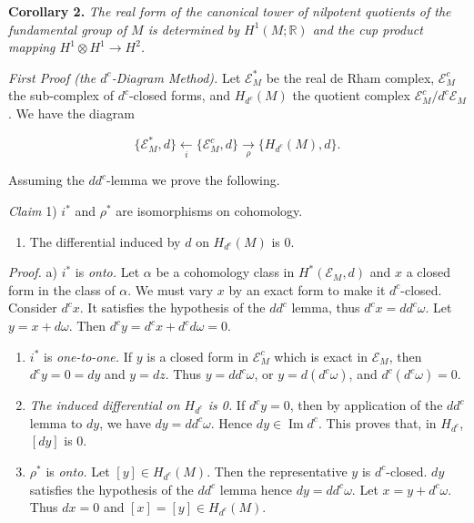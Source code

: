 \documentclass[
  english,
  a3paper,
  a3paper]{extarticle}
\providecommand{\tightlist}{%
  \setlength{\itemsep}{0pt}\setlength{\parskip}{0pt}}
\begin{document}
\textbf{Corollary 2.} \emph{The real form of the canonical tower of
nilpotent quotients of the fundamental group of \(M\) is determined by
\(H^1(M;\mathbb R)\) and the cup product mapping
\(H^1\otimes H^1\longrightarrow H^2\).}

\emph{First Proof (the \(d^c\)-Diagram Method).} Let \(\mathscr E_M^*\)
be the real de Rham complex, \(\mathscr E_M^c\) the sub-complex of
\(d^c\)-closed forms, and \(H_{d^c}(M)\) the quotient complex
\(\mathscr E_M^c/d^c\mathscr E_M\). We have the diagram

\[\{\mathscr E_M^*,d\}\underset{i}{\longleftarrow}\{\mathscr E_M^c,d\}\underset{\rho}{\longrightarrow}\{H_{d^c}(M),d\}.\]

Assuming the \(dd^c\)-lemma we prove the following.

\emph{Claim} 1) \(i^*\) and \(\rho^*\) are isomorphisms on cohomology.

\begin{enumerate}
\def\labelenumi{\arabic{enumi})}
\setcounter{enumi}{1}
\tightlist
\item
  The differential induced by \(d\) on \(H_{d^c}(M)\) is 0.
\end{enumerate}

\emph{Proof.} a) \(i^*\) is \emph{onto.} Let \(\alpha\) be a cohomology
class in \(H^*(\mathscr E_M,d)\) and \(x\) a closed form in the class of
\(\alpha\). We must vary \(x\) by an exact form to make it
\(d^c\)-closed. Consider \(d^cx\). It satisfies the hypothesis of the
\(dd^c\) lemma, thus \(d^cx=dd^c\omega\). Let \(y=x+d\omega\). Then
\(d^cy=d^cx+d^cd\omega=0\).

\begin{enumerate}
\def\labelenumi{\alph{enumi})}
\setcounter{enumi}{1}
\item
  \(i^*\) is \emph{one-to-one.} If \(y\) is a closed form in
  \(\mathscr E_M^c\) which is exact in \(\mathscr E_M\), then
  \(d^cy=0=dy\) and \(y=dz\). Thus \(y=dd^c\omega\), or
  \(y=d(d^c\omega)\), and \(d^c(d^c\omega)=0\).
\item
  \emph{The induced differential on \(H_{d^c}\) is 0.} If \(d^cy=0\),
  then by application of the \(dd^c\) lemma to \(dy\), we have
  \(dy=dd^c\omega\). Hence \(dy\in\operatorname{Im}d^c\). This proves
  that, in \(H_{d^c}\), \([dy]\) is 0.
\item
  \(\rho^*\) is \emph{onto.} Let \([y]\in H_{d^c}(M)\). Then the
  representative \(y\) is \(d^c\)-closed. \(dy\) satisfies the
  hypothesis of the \(dd^c\) lemma hence \(dy=dd^c\omega\). Let
  \(x=y+d^c\omega\). Thus \(dx=0\) and \([x]=[y]\in H_{d^c}(M)\).
\end{enumerate}
\end{document}
